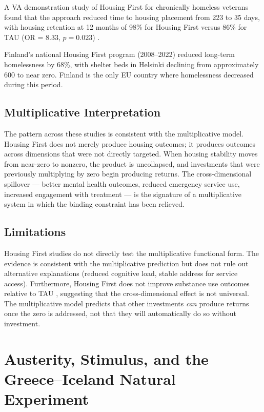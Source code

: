 \documentclass[12pt]{article}
\begin{document}
A VA demonstration study of Housing First for chronically homeless veterans found that the approach reduced time to housing placement from 223 to 35 days, with housing retention at 12 months of 98\% for Housing First versus 86\% for TAU (OR = 8.33, $p = 0.023$) \citep{montgomery2013}.

Finland's national Housing First program (2008--2022) reduced long-term homelessness by 68\%, with shelter beds in Helsinki declining from approximately 600 to near zero. Finland is the only EU country where homelessness decreased during this period.

\subsection{Multiplicative Interpretation}

The pattern across these studies is consistent with the multiplicative model. Housing First does not merely produce housing outcomes; it produces outcomes across dimensions that were not directly targeted. When housing stability moves from near-zero to nonzero, the product is uncollapsed, and investments that were previously multiplying by zero begin producing returns. The cross-dimensional spillover --- better mental health outcomes, reduced emergency service use, increased engagement with treatment --- is the signature of a multiplicative system in which the binding constraint has been relieved.

\subsection{Limitations}

Housing First studies do not directly test the multiplicative functional form. The evidence is consistent with the multiplicative prediction but does not rule out alternative explanations (reduced cognitive load, stable address for service access). Furthermore, Housing First does not improve substance use outcomes relative to TAU \citep{somers2015}, suggesting that the cross-dimensional effect is not universal. The multiplicative model predicts that other investments \emph{can} produce returns once the zero is addressed, not that they will automatically do so without investment.


\section{Austerity, Stimulus, and the Greece--Iceland Natural Experiment}
\label{sec:austerity}
\end{document}
